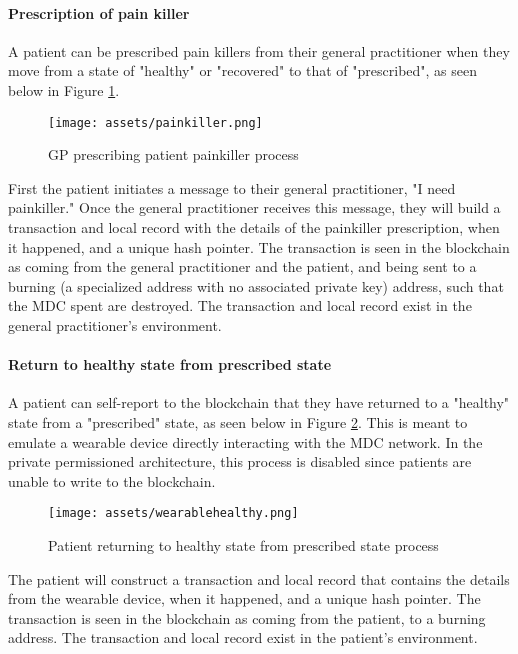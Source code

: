 \documentclass[12pt]{report}
\begin{document}
\paragraph{Prescription of pain killer}
A patient can be prescribed pain killers from their general practitioner when they move from a state of "healthy" or "recovered" to that of "prescribed", as seen below in Figure \ref{fig:painkiller}.

\begin{figure}[!h]
\texttt{[image: assets/painkiller.png]}
\caption{GP prescribing patient painkiller process}
\label{fig:painkiller}
\end{figure}

First the patient initiates a message to their general practitioner, "I need painkiller." Once the general practitioner receives this message, they will build a transaction and local record with the details of the painkiller prescription, when it happened, and a unique hash pointer. The transaction is seen in the blockchain as coming from the general practitioner and the patient, and being sent to a burning (a specialized address with no associated private key) address, such that the MDC spent are destroyed. The transaction and local record exist in the general practitioner's environment.

\paragraph{Return to healthy state from prescribed state}
A patient can self-report to the blockchain that they have returned to a "healthy" state from a "prescribed" state, as seen below in Figure \ref{fig:wearablehealthy}. This is meant to emulate a wearable device directly interacting with the MDC network. In the private permissioned architecture, this process is disabled since patients are unable to write to the blockchain.

\begin{figure}[!h]
\begin{center}
\texttt{[image: assets/wearablehealthy.png]}
\end{center}
\caption{Patient returning to healthy state from prescribed state process}
\label{fig:wearablehealthy}
\end{figure}

The patient will construct a transaction and local record that contains the details from the wearable device, when it happened, and a unique hash pointer.  The transaction is seen in the blockchain as coming from the patient, to a burning address. The transaction and local record exist in the patient's environment.
\end{document}
